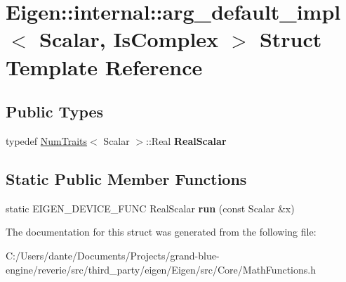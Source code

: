 \hypertarget{struct_eigen_1_1internal_1_1arg__default__impl}{}\section{Eigen\+::internal\+::arg\+\_\+default\+\_\+impl$<$ Scalar, Is\+Complex $>$ Struct Template Reference}
\label{struct_eigen_1_1internal_1_1arg__default__impl}
\subsection*{Public Types}
\begin{DoxyCompactItemize}
\item 
\mbox{\label{struct_eigen_1_1internal_1_1arg__default__impl_a5a133422fa2d2384dcfd54771e5a3403}} 
typedef \mbox{\hyperlink{struct_eigen_1_1_num_traits}{Num\+Traits}}$<$ Scalar $>$\+::Real {\bfseries Real\+Scalar}
\end{DoxyCompactItemize}
\subsection*{Static Public Member Functions}
\begin{DoxyCompactItemize}
\item 
\mbox{\label{struct_eigen_1_1internal_1_1arg__default__impl_a22d98d5c10648c584e2eb678ff2eb895}} 
static E\+I\+G\+E\+N\+\_\+\+D\+E\+V\+I\+C\+E\+\_\+\+F\+U\+NC Real\+Scalar {\bfseries run} (const Scalar \&x)
\end{DoxyCompactItemize}


The documentation for this struct was generated from the following file\+:\begin{DoxyCompactItemize}
\item 
C\+:/\+Users/dante/\+Documents/\+Projects/grand-\/blue-\/engine/reverie/src/third\+\_\+party/eigen/\+Eigen/src/\+Core/Math\+Functions.\+h\end{DoxyCompactItemize}
